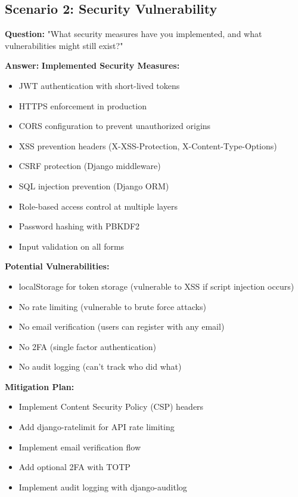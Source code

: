 \documentclass[11pt,a4paper]{article}
\begin{document}
\subsection{Scenario 2: Security Vulnerability}
\textbf{Question:} "What security measures have you implemented, and what vulnerabilities might still exist?"

\textbf{Answer:}
\textbf{Implemented Security Measures:}
\begin{itemize}[leftmargin=*]
    \item JWT authentication with short-lived tokens
    \item HTTPS enforcement in production
    \item CORS configuration to prevent unauthorized origins
    \item XSS prevention headers (X-XSS-Protection, X-Content-Type-Options)
    \item CSRF protection (Django middleware)
    \item SQL injection prevention (Django ORM)
    \item Role-based access control at multiple layers
    \item Password hashing with PBKDF2
    \item Input validation on all forms
\end{itemize}

\textbf{Potential Vulnerabilities:}
\begin{itemize}[leftmargin=*]
    \item localStorage for token storage (vulnerable to XSS if script injection occurs)
    \item No rate limiting (vulnerable to brute force attacks)
    \item No email verification (users can register with any email)
    \item No 2FA (single factor authentication)
    \item No audit logging (can't track who did what)
\end{itemize}

\textbf{Mitigation Plan:}
\begin{itemize}[leftmargin=*]
    \item Implement Content Security Policy (CSP) headers
    \item Add django-ratelimit for API rate limiting
    \item Implement email verification flow
    \item Add optional 2FA with TOTP
    \item Implement audit logging with django-auditlog
\end{itemize}
\end{document}
